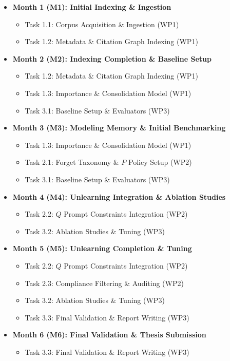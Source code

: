 \begin{itemize}[leftmargin=*]
    \item \textbf{Month 1 (M1): Initial Indexing \& Ingestion}
    \begin{itemize}
        \item Task 1.1: Corpus Acquisition \& Ingestion (WP1)
        \item Task 1.2: Metadata \& Citation Graph Indexing (WP1)
    \end{itemize}
    \item \textbf{Month 2 (M2): Indexing Completion \& Baseline Setup}
    \begin{itemize}
        \item Task 1.2: Metadata \& Citation Graph Indexing (WP1)
        \item Task 1.3: Importance \& Consolidation Model (WP1)
        \item Task 3.1: Baseline Setup \& Evaluators (WP3)
    \end{itemize}
    \item \textbf{Month 3 (M3): Modeling Memory \& Initial Benchmarking}
    \begin{itemize}
        \item Task 1.3: Importance \& Consolidation Model (WP1)
        \item Task 2.1: Forget Taxonomy \& $P$ Policy Setup (WP2)
        \item Task 3.1: Baseline Setup \& Evaluators (WP3)
    \end{itemize}
    \item \textbf{Month 4 (M4): Unlearning Integration \& Ablation Studies}
    \begin{itemize}
        \item Task 2.2: $Q$ Prompt Constraints Integration (WP2)
        \item Task 3.2: Ablation Studies \& Tuning (WP3)
    \end{itemize}
    \item \textbf{Month 5 (M5): Unlearning Completion \& Tuning}
    \begin{itemize}
        \item Task 2.2: $Q$ Prompt Constraints Integration (WP2)
        \item Task 2.3: Compliance Filtering \& Auditing (WP2)
        \item Task 3.2: Ablation Studies \& Tuning (WP3)
        \item Task 3.3: Final Validation \& Report Writing (WP3)
    \end{itemize}
    \item \textbf{Month 6 (M6): Final Validation \& Thesis Submission}
    \begin{itemize}
        \item Task 3.3: Final Validation \& Report Writing (WP3)
    \end{itemize}
\end{itemize}


